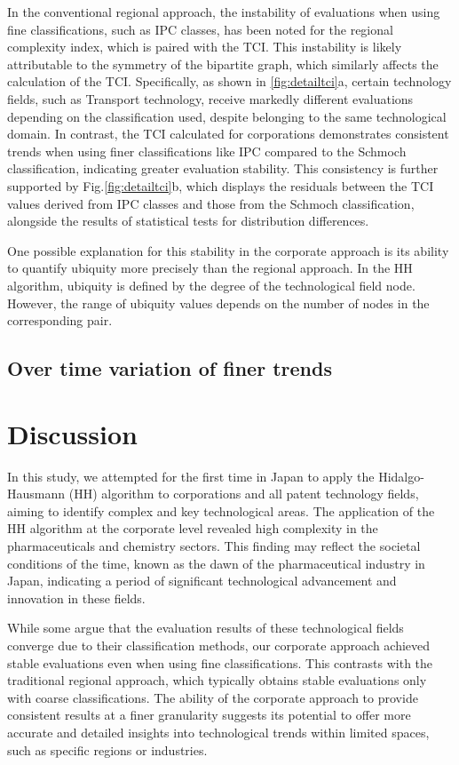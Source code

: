\documentclass[fleqn,10pt]{wlscirep}
\begin{document}
In the conventional regional approach, the instability of evaluations when using fine classifications, such as IPC classes, has been noted for the regional complexity index, which is paired with the TCI. 
This instability is likely attributable to the symmetry of the bipartite graph, which similarly affects the calculation of the TCI. Specifically, as shown in \ref{fig:detailtci}a, certain technology fields, such as Transport technology, receive markedly different evaluations depending on the classification used, despite belonging to the same technological domain. 
In contrast, the TCI calculated for corporations demonstrates consistent trends when using finer classifications like IPC compared to the Schmoch classification, indicating greater evaluation stability. 
This consistency is further supported by Fig.\ref{fig:detailtci}b, which displays the residuals between the TCI values derived from IPC classes and those from the Schmoch classification, alongside the results of statistical tests for distribution differences.

One possible explanation for this stability in the corporate approach is its ability to quantify ubiquity more precisely than the regional approach. 
In the HH algorithm, ubiquity is defined by the degree of the technological field node. 
However, the range of ubiquity values depends on the number of nodes in the corresponding pair.

\subsection*{Over time variation of finer trends}


\section*{Discussion}

In this study, we attempted for the first time in Japan to apply the Hidalgo-Hausmann (HH) algorithm to corporations and all patent technology fields, aiming to identify complex and key technological areas. 
The application of the HH algorithm at the corporate level revealed high complexity in the pharmaceuticals and chemistry sectors. This finding may reflect the societal conditions of the time, known as the dawn of the pharmaceutical industry in Japan, indicating a period of significant technological advancement and innovation in these fields.

While some argue that the evaluation results of these technological fields converge due to their classification methods, our corporate approach achieved stable evaluations even when using fine classifications. 
This contrasts with the traditional regional approach, which typically obtains stable evaluations only with coarse classifications. 
The ability of the corporate approach to provide consistent results at a finer granularity suggests its potential to offer more accurate and detailed insights into technological trends within limited spaces, such as specific regions or industries.
\end{document}
